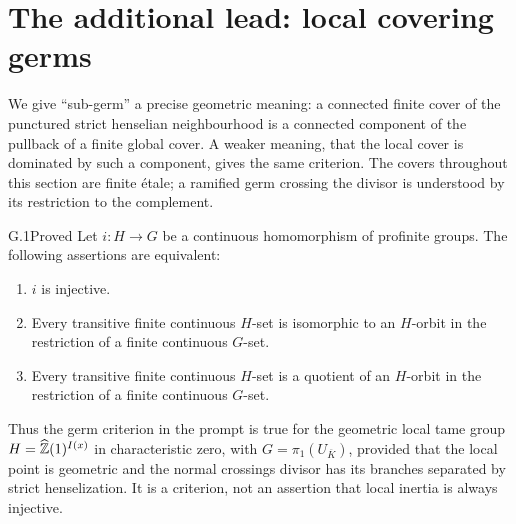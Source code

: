 \section{The additional lead: local covering germs}
\label{sec:locallead}

We give ``sub-germ'' a precise geometric meaning: a connected finite
cover of the punctured strict henselian neighbourhood is a connected
component of the pullback of a finite global cover. A weaker meaning,
that the local cover is dominated by such a component, gives the same
criterion. The covers throughout this section are finite \'etale; a
ramified germ crossing the divisor is understood by its restriction to
the complement.

\begin{claim}{G.1}{Proved}
Let $i:H\to G$ be a continuous homomorphism of profinite groups.
The following assertions are equivalent:
\begin{enumerate}[label=(\roman*)]
\item $i$ is injective.
\item Every transitive finite continuous $H$-set is isomorphic to an
$H$-orbit in the restriction of a finite continuous $G$-set.
\item Every transitive finite continuous $H$-set is a quotient of an
$H$-orbit in the restriction of a finite continuous $G$-set.
\end{enumerate}
Thus the germ criterion in the prompt is true for the geometric local
tame group $H=\widehat{\mathbb Z}(1)^{I(x)}$ in characteristic zero, with
$G=\pi_1(U_{\overline K})$, provided that the local point is geometric
and the normal crossings divisor has its branches separated by strict
henselization. It is a criterion, not an assertion that local inertia
is always injective.
\end{claim}
